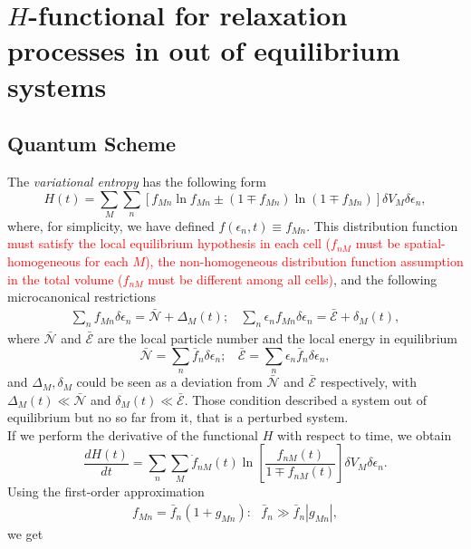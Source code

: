 \documentclass{article}
\begin{document}
\section{$H$-functional for relaxation processes in out of equilibrium systems}


\subsection{Quantum Scheme}

The \textit{variational entropy} has the following form
\begin{equation}
    H(t)=\sum_{M} \sum_{n} \left[ f_{Mn} \ln f_{Mn} \pm (1 \mp f_{Mn}) \ln (1 \mp f_{Mn}) \right]\delta V_M \delta \epsilon_n \label{entropy2},
\end{equation}
where, for simplicity, we have defined $f(\epsilon_{n},t)\equiv f_{Mn}$.
This distribution function \textcolor{red}{must satisfy the local equilibrium hypothesis in each cell ($f_{nM}$ must be spatial-homogeneous for each $M$), the non-homogeneous distribution function assumption in the total volume ($f_{nM}$ must be different among all cells)}, and the following microcanonical restrictions
\begin{eqnarray}
        \sum_{n}f_{Mn} \delta \epsilon_n=\bar{\mathcal{N}}+\Delta_M(t); \ \ \ \ \sum_{n}\epsilon_{n}f_{Mn} \delta \epsilon_n=\bar{\mathcal{E}}+ \delta_M(t), \label{restrictionoutside}
  \end{eqnarray}
  where $\bar {\mathcal{N}}$ and $\bar{\mathcal{E}}$ are the local particle number and the local energy in equilibrium
  \begin{equation}
      \bar{\mathcal{N}}= \sum_n \bar{f}_n \delta \epsilon_n; \ \ \ \ \bar{\mathcal{E}}= \sum_n \epsilon_n\bar{f}_n \delta \epsilon_n,
  \end{equation}
  and $\Delta_M,\delta_M$ could be seen as a deviation from $\bar{\mathcal{N}}$ and $\bar{\mathcal{E}}$ respectively, with $\Delta_M(t)\ll \bar{\mathcal{N}}$ and $\delta_M(t) \ll \bar{\mathcal{E}}$. Those condition described a system out of equilibrium but no so far from it, that is a perturbed system.  \\
If we perform the derivative of the functional $H$ with respect to time, we obtain
\begin{equation}
   \frac{dH(t)}{dt}= \sum_n \sum_M \dot{f}_{nM}(t)\ln \left[ \frac{f_{nM}(t)}{1\mp f_{nM}(t)} \right]\delta V_M \delta \epsilon_n.\label{deltaH}
\end{equation}{}
Using the first-order approximation
\begin{eqnarray}
   f_{Mn}=\bar{f}_{n}(1+g_{Mn}): \ \ \ \bar{f}_{n}\gg \bar{f}_{n}|g_{Mn}|, \label{firstorder}
\end{eqnarray}{}
we get 
\end{document}
